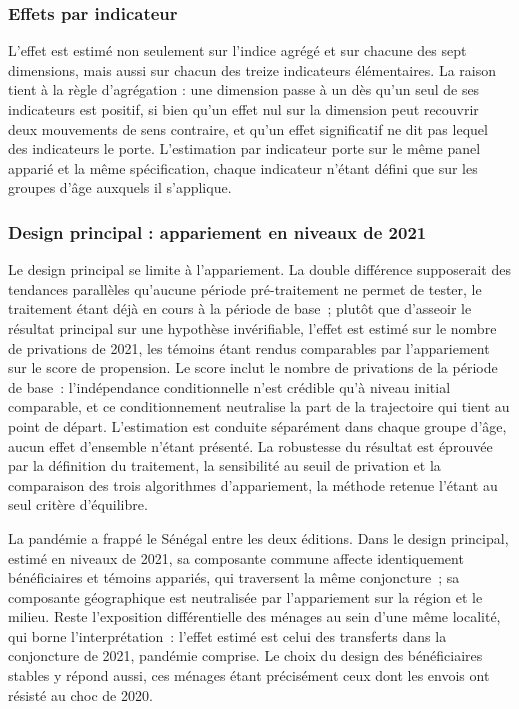 \subsubsection{Effets par indicateur}
L'effet est estimé non seulement sur l'indice agrégé et sur chacune des sept
dimensions, mais aussi sur chacun des treize indicateurs élémentaires. La
raison tient à la règle d'agrégation : une dimension passe à un dès qu'un seul
de ses indicateurs est positif, si bien qu'un effet nul sur la dimension peut
recouvrir deux mouvements de sens contraire, et qu'un effet significatif ne dit
pas lequel des indicateurs le porte. L'estimation par indicateur porte sur le
même panel apparié et la même spécification, chaque indicateur n'étant défini
que sur les groupes d'âge auxquels il s'applique.

\subsubsection{Design principal : appariement en niveaux de 2021}

Le design principal se limite à l'appariement. La double différence
supposerait des tendances parallèles qu'aucune période pré-traitement ne
permet de tester, le traitement étant déjà en cours à la période de base~;
plutôt que d'asseoir le résultat principal sur une hypothèse invérifiable,
l'effet est estimé sur le nombre de privations de 2021, les témoins étant
rendus comparables par l'appariement sur le score de propension. Le score
inclut le nombre de privations de la période de base~: l'indépendance
conditionnelle n'est crédible qu'à niveau initial comparable, et ce
conditionnement neutralise la part de la trajectoire qui tient au point de
départ. L'estimation est conduite séparément dans chaque groupe d'âge,
aucun effet d'ensemble n'étant présenté. La robustesse du résultat est éprouvée par la
définition du traitement, la sensibilité au seuil de privation et la
comparaison des trois algorithmes d'appariement, la méthode retenue l'étant
au seul critère d'équilibre.

La pandémie a frappé le Sénégal entre les deux éditions. Dans le design
principal, estimé en niveaux de 2021, sa composante commune affecte
identiquement bénéficiaires et témoins appariés, qui traversent la même
conjoncture~; sa composante géographique est neutralisée par l'appariement
sur la région et le milieu. Reste l'exposition différentielle des ménages
au sein d'une même localité, qui borne l'interprétation~: l'effet estimé
est celui des transferts dans la conjoncture de 2021, pandémie comprise.
Le choix du design des bénéficiaires stables y répond aussi, ces ménages
étant précisément ceux dont les envois ont résisté au choc de 2020.

